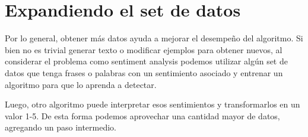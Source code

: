 
\section{Expandiendo el set de datos}

Por lo general, obtener más datos ayuda a mejorar el desempe\~no del algoritmo. Si bien no es
trivial generar texto o modificar ejemplos para obtener nuevos, al considerar el problema como
sentiment analysis podemos utilizar alg\'un set de datos que tenga frases o palabras con un
sentimiento asociado y entrenar un algoritmo para que lo aprenda a detectar.

Luego, otro algoritmo puede interpretar esos sentimientos y transformarlos en un valor 1-5.
De esta forma podemos aprovechar una cantidad mayor de datos, agregando un paso intermedio. \cite{lexicons_db}
